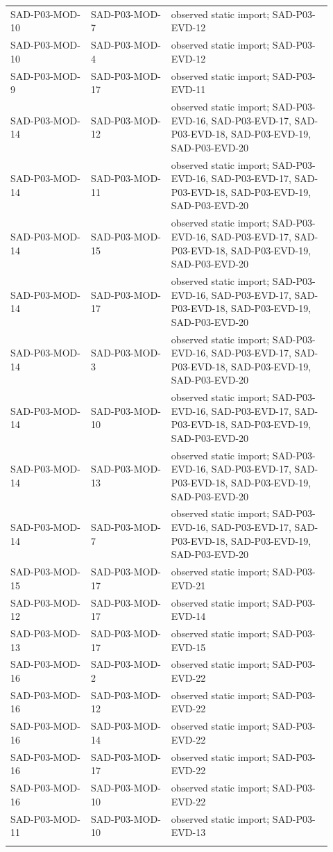 \documentclass[10pt,letterpaper]{article}
\begin{document}
\begin{longtable}{@{}>{\raggedright\arraybackslash}p{0.23\linewidth}>{\raggedright\arraybackslash}p{0.23\linewidth}>{\raggedright\arraybackslash}p{0.46\linewidth}@{}}
SAD-P03-MOD-10 & SAD-P03-MOD-7 & observed static import; SAD-P03-EVD-12\\\addlinespace
SAD-P03-MOD-10 & SAD-P03-MOD-4 & observed static import; SAD-P03-EVD-12\\\addlinespace
SAD-P03-MOD-9 & SAD-P03-MOD-17 & observed static import; SAD-P03-EVD-11\\\addlinespace
SAD-P03-MOD-14 & SAD-P03-MOD-12 & observed static import; SAD-P03-EVD-16, SAD-P03-EVD-17, SAD-P03-EVD-18, SAD-P03-EVD-19, SAD-P03-EVD-20\\\addlinespace
SAD-P03-MOD-14 & SAD-P03-MOD-11 & observed static import; SAD-P03-EVD-16, SAD-P03-EVD-17, SAD-P03-EVD-18, SAD-P03-EVD-19, SAD-P03-EVD-20\\\addlinespace
SAD-P03-MOD-14 & SAD-P03-MOD-15 & observed static import; SAD-P03-EVD-16, SAD-P03-EVD-17, SAD-P03-EVD-18, SAD-P03-EVD-19, SAD-P03-EVD-20\\\addlinespace
SAD-P03-MOD-14 & SAD-P03-MOD-17 & observed static import; SAD-P03-EVD-16, SAD-P03-EVD-17, SAD-P03-EVD-18, SAD-P03-EVD-19, SAD-P03-EVD-20\\\addlinespace
SAD-P03-MOD-14 & SAD-P03-MOD-3 & observed static import; SAD-P03-EVD-16, SAD-P03-EVD-17, SAD-P03-EVD-18, SAD-P03-EVD-19, SAD-P03-EVD-20\\\addlinespace
SAD-P03-MOD-14 & SAD-P03-MOD-10 & observed static import; SAD-P03-EVD-16, SAD-P03-EVD-17, SAD-P03-EVD-18, SAD-P03-EVD-19, SAD-P03-EVD-20\\\addlinespace
SAD-P03-MOD-14 & SAD-P03-MOD-13 & observed static import; SAD-P03-EVD-16, SAD-P03-EVD-17, SAD-P03-EVD-18, SAD-P03-EVD-19, SAD-P03-EVD-20\\\addlinespace
SAD-P03-MOD-14 & SAD-P03-MOD-7 & observed static import; SAD-P03-EVD-16, SAD-P03-EVD-17, SAD-P03-EVD-18, SAD-P03-EVD-19, SAD-P03-EVD-20\\\addlinespace
SAD-P03-MOD-15 & SAD-P03-MOD-17 & observed static import; SAD-P03-EVD-21\\\addlinespace
SAD-P03-MOD-12 & SAD-P03-MOD-17 & observed static import; SAD-P03-EVD-14\\\addlinespace
SAD-P03-MOD-13 & SAD-P03-MOD-17 & observed static import; SAD-P03-EVD-15\\\addlinespace
SAD-P03-MOD-16 & SAD-P03-MOD-2 & observed static import; SAD-P03-EVD-22\\\addlinespace
SAD-P03-MOD-16 & SAD-P03-MOD-12 & observed static import; SAD-P03-EVD-22\\\addlinespace
SAD-P03-MOD-16 & SAD-P03-MOD-14 & observed static import; SAD-P03-EVD-22\\\addlinespace
SAD-P03-MOD-16 & SAD-P03-MOD-17 & observed static import; SAD-P03-EVD-22\\\addlinespace
SAD-P03-MOD-16 & SAD-P03-MOD-10 & observed static import; SAD-P03-EVD-22\\\addlinespace
SAD-P03-MOD-11 & SAD-P03-MOD-10 & observed static import; SAD-P03-EVD-13\\\addlinespace
\bottomrule\end{longtable}
\end{document}
